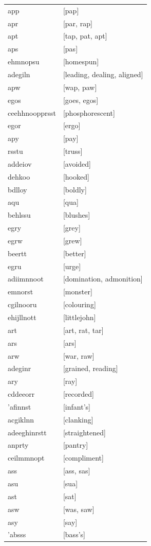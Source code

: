 \documentclass{article}
\begin{document}
\begin{tabular}{ll}
app & [pap] \\
apr & [par, rap] \\
apt & [tap, pat, apt] \\
aps & [pas] \\
ehmnopsu & [homespun] \\
adegiln & [leading, dealing, aligned] \\
apw & [wap, paw] \\
egos & [goes, egos] \\
ceehhnoopprsst & [phosphorescent] \\
egor & [ergo] \\
apy & [pay] \\
rsstu & [truss] \\
addeiov & [avoided] \\
dehkoo & [hooked] \\
bdlloy & [boldly] \\
aqu & [qua] \\
behlssu & [blushes] \\
egry & [grey] \\
egrw & [grew] \\
beertt & [better] \\
egru & [urge] \\
adiimnnoot & [domination, admonition] \\
emnorst & [monster] \\
cgilnooru & [colouring] \\
ehijllnott & [littlejohn] \\
art & [art, rat, tar] \\
ars & [ars] \\
arw & [war, raw] \\
adeginr & [grained, reading] \\
ary & [ray] \\
cddeeorr & [recorded] \\
'afinnst & [infant's] \\
acgiklnn & [clanking] \\
adeeghinrstt & [straightened] \\
anprty & [pantry] \\
ceilmmnopt & [compliment] \\
ass & [ass, sas] \\
asu & [sua] \\
ast & [sat] \\
asw & [was, saw] \\
asy & [say] \\
'absss & [bass's] \\

\end{tabular}
\end{document}
